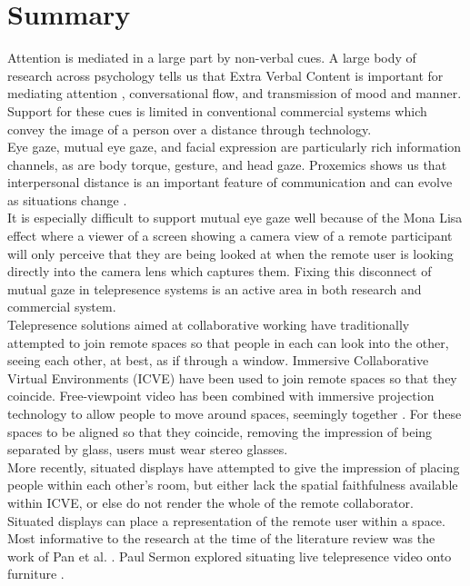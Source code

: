 \section{Summary}
Attention is mediated in a large part by non-verbal cues. A large body of research across psychology tells us that Extra Verbal Content is important \cite{Goodwin2000a} for mediating attention \cite{Stiefelhagen2001, Sellen1992, Stiefelhagen2002, Deckers2013, Gibson1963, Bente1998, Slessor2008, Argyle, Hofmann20061683, Pan2008a, Vertegaal1997}, conversational flow, and transmission of mood and manner.\\
Support for these cues is limited in conventional commercial systems which convey the image of a person over a distance through technology. \\
Eye gaze, mutual eye gaze, and facial expression \cite{Hager1979, Argyle, ohba1998facial} are particularly rich information channels, as are body torque, gesture, and head gaze. Proxemics shows us that interpersonal distance is an important feature of communication and can evolve as situations change \cite{Hall1969}.\\
It is especially difficult to support mutual eye gaze well because of the Mona Lisa effect where a viewer of a screen showing a camera view of a remote participant will only perceive that they are being looked at when the remote user is looking directly into the camera lens which captures them. Fixing this disconnect of mutual gaze in telepresence systems is an active area in both research and commercial system. \\
Telepresence solutions aimed at collaborative working have traditionally attempted to join remote spaces so that people in each can look into the other, seeing each other, at best, as if through a window. Immersive Collaborative Virtual Environments (ICVE) have been used to join remote spaces so that they coincide. Free-viewpoint video has been combined with immersive projection technology to allow people to move around spaces, seemingly together \cite{Roberts2015}. For these spaces to be aligned so that they coincide, removing the impression of being separated by glass, users must wear stereo glasses. \\
More recently, situated displays have attempted to give the impression of placing people within each other's room, but either lack the spatial faithfulness available within ICVE, or else do not render the whole of the remote collaborator.  \\
Situated displays can place a representation of the remote user within a space. Most informative to the research at the time of the literature review was the work of Pan et al. \cite{Oyekoya2012, pan2014comparing, Pan2012a, Pan2014a}. Paul Sermon explored situating live telepresence video onto furniture \cite{Sermon2000}.  \\
